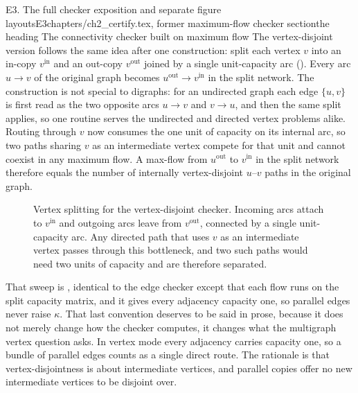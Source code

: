 \begin{offcut}{E3. The full checker exposition and separate figure layouts}{E3}{chapters/ch2\_certify.tex, former maximum-flow checker section}{the heading The connectivity checker built on maximum flow}
The vertex-disjoint version follows the same idea after one construction: split each vertex $v$ into an in-copy $v^{\mathrm{in}}$ and an out-copy $v^{\mathrm{out}}$ joined by a single unit-capacity arc (). Every arc $u \to v$ of the original graph becomes $u^{\mathrm{out}} \to v^{\mathrm{in}}$ in the split network. The construction is not special to digraphs: for an undirected graph each edge $\{u,v\}$ is first read as the two opposite arcs $u \to v$ and $v \to u$, and then the same split applies, so one routine serves the undirected and directed vertex problems alike. Routing through $v$ now consumes the one unit of capacity on its internal arc, so two paths sharing $v$ as an intermediate vertex compete for that unit and cannot coexist in any maximum flow. A max-flow from $u^{\mathrm{out}}$ to $v^{\mathrm{in}}$ in the split network therefore equals the number of internally vertex-disjoint $u$--$v$ paths in the original graph.

\begin{figure}[ht]
\centering
{}
\caption{Vertex splitting for the vertex-disjoint checker. Incoming arcs attach to $v^{\mathrm{in}}$ and outgoing arcs leave from $v^{\mathrm{out}}$, connected by a single unit-capacity arc. Any directed path that uses $v$ as an intermediate vertex passes through this bottleneck, and two such paths would need two units of capacity and are therefore separated.}
\end{figure}

That sweep is , identical to the edge checker except that each flow runs on the split capacity matrix, and it gives every adjacency capacity one, so parallel edges never raise $\kappa$. That last convention deserves to be said in prose, because it does not merely change how the checker computes, it changes what the multigraph vertex question asks. In vertex mode every adjacency carries capacity one, so a bundle of parallel edges counts as a single direct route. The rationale is that vertex-disjointness is about intermediate vertices, and parallel copies offer no new intermediate vertices to be disjoint over.


\end{offcut}
